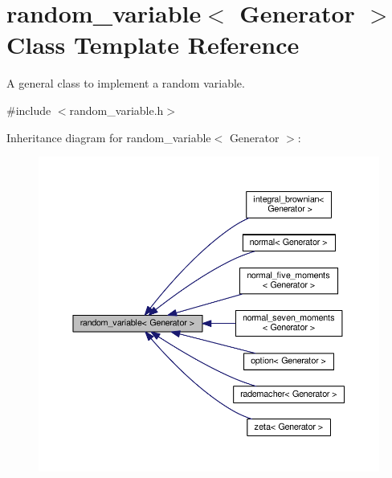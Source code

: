 \hypertarget{classrandom__variable}{}\section{random\+\_\+variable$<$ Generator $>$ Class Template Reference}
\label{classrandom__variable}


A general class to implement a random variable.  




{\ttfamily \#include $<$random\+\_\+variable.\+h$>$}



Inheritance diagram for random\+\_\+variable$<$ Generator $>$\+:\nopagebreak
\begin{figure}[H]
\begin{center}
\leavevmode
\includegraphics[width=350pt]{classrandom__variable__inherit__graph}
\end{center}
\end{figure}
